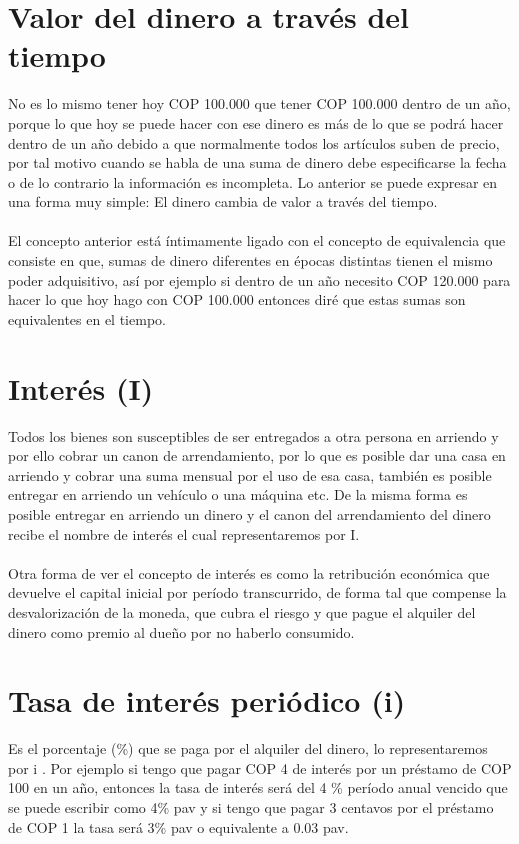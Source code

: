 \section{Valor del dinero a través del tiempo}
No es lo mismo tener hoy  COP 100{.}000 que tener  COP 100{.}000 dentro de un año, porque lo que hoy se puede hacer con ese dinero es más de lo que se podrá hacer dentro de un año debido a que normalmente todos los artículos suben de precio, por tal motivo cuando se habla de una suma de dinero debe especificarse la fecha o de lo contrario la información es incompleta. Lo anterior se puede expresar en una forma muy simple: El dinero cambia de valor a través del tiempo.
\\\\
El concepto anterior está íntimamente ligado con el concepto de equivalencia que consiste en que, sumas de dinero diferentes en épocas distintas tienen el mismo poder adquisitivo, así por ejemplo si dentro de un año necesito  COP 120{.}000 para hacer lo que hoy hago con  COP 100{.}000 entonces diré que estas sumas son equivalentes en el tiempo.

\section{Interés (I)}

Todos los bienes son susceptibles de ser entregados a otra persona en arriendo y por ello cobrar un canon de arrendamiento, por lo que es posible dar una casa en arriendo y cobrar una suma mensual por el uso de esa casa, también es posible entregar en arriendo un vehículo o una máquina etc. De la misma forma es posible entregar en arriendo un dinero y el canon del arrendamiento del dinero recibe el nombre de interés el cual representaremos por I.
\\\\
Otra forma de ver el concepto de interés es como la retribución económica que devuelve el capital inicial por período transcurrido, de forma tal que compense la desvalorización de la moneda, que cubra el riesgo y que pague el alquiler del dinero como premio al dueño por no haberlo consumido.

\section{Tasa de interés periódico (i)}
Es el porcentaje (\%) que se paga por el alquiler del dinero, lo representaremos por i . Por ejemplo si tengo que pagar  COP 4 de interés por un préstamo de  COP 100 en un año, entonces la tasa de interés será del 4 \% período anual vencido que se puede escribir como 4\% pav y si tengo que pagar 3 centavos por el préstamo de  COP 1 la tasa será  3\% pav o equivalente a 0{.}03 pav.

